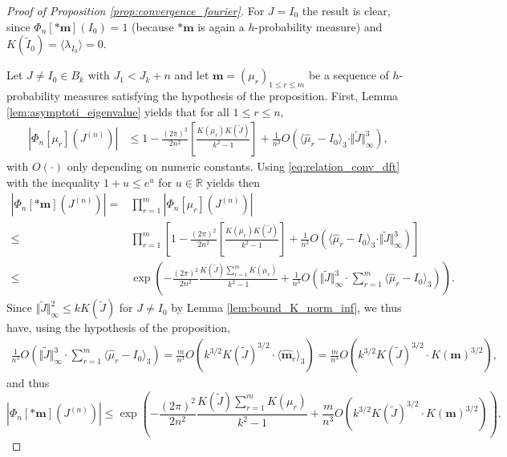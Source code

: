 \documentclass[10pt,11pt]{amsart}%
\begin{document}
\begin{proof}[Proof of Proposition \ref{prop:convergence_fourier}]
For $J=I_0$ the result is clear, since $\Phi_n[*\mathbf{m}](I_0)=1$ (because $*\mathbf{m}$ is again a $h$-probability measure) and $K(\tilde{I}_0)=\langle \lambda_{I_0}\rangle=0$. 

Let $J\not=I_0\in B_{k}$ with $J_1<J_k+n$ and let $\mathbf{m}=(\mu_r)_{1\leq r\leq m}$ be a sequence of $h$-probability measures satisfying the hypothesis of the proposition. 
First, Lemma \ref{lem:asymptoti_eigenvalue} yields that for all $1\leq r\leq n$,
\begin{align*}
\left\vert\Phi_{n}[\mu_r](J^{(n)})\right\vert&\leq 1-\frac{(2\pi)^2}{2n^2}\left[\frac{K(\mu_r)K(\tilde{J})}{k^2-1}\right]+\frac{1}{n^3}O\left(\langle\hat{\mu}_r-I_0\rangle_3\cdot\Vert \tilde{J}\Vert_\infty^3\right),
\end{align*}
with $O(\cdot)$ only depending on numeric constants. Using \eqref{eq:relation_conv_dft} with the inequality $1+u\leq e^u$ for $u\in\mathbb{R}$ yields then
\begin{align*}
\left\vert\Phi_{n}[*\mathbf{m}](J^{(n)})\right\vert=&\prod_{r=1}^m\left\vert \Phi_{n}[\mu_r](J^{(n)})\right\vert \\
\leq& \prod_{r=1}^m\left[1-\frac{(2\pi)^2}{2n^2}\left[\frac{K(\mu_r)K(\tilde{J})}{k^2-1}\right]+\frac{1}{n^3}O\left(\langle\hat{\mu}_r-I_0\rangle_3\cdot\Vert \tilde{J}\Vert_\infty^3\right)\right]\\
\leq&\exp\left(-\frac{(2\pi)^2}{2n^2}\frac{K(\tilde{J})\sum_{r=1}^mK(\mu_r)}{k^2-1}+\frac{1}{n^3}O\left(\Vert \tilde{J}\Vert_\infty^3\cdot\sum_{r=1}^m\langle\hat{\mu}_r-I_0\rangle_3\right)\right).
\end{align*}
Since $\Vert \tilde{J}\Vert^2_{\infty}\leq kK(\tilde{J})$ for $J\not=I_0$ by Lemma \ref{lem:bound_K_norm_inf}, we thus have, using the hypothesis of the proposition,
\begin{align*}
\frac{1}{n^3}O\left(\Vert \tilde{J}\Vert_\infty^3\cdot\sum_{r=1}^m\langle\hat{\mu}_r-I_0\rangle_3\right)=\frac{m}{n^3}O\left(k^{3/2}K(\tilde{J})^{3/2}\cdot\langle  \hat{\mathbf{m}}_r\rangle_3\right)=\frac{m}{n^3}O\left(k^{3/2}K(\tilde{J})^{3/2}\cdot K(\mathbf{m})^{3/2}\right),
\end{align*}
and thus
\begin{equation}\label{eq:proof_prop_first_ineq}
\left\vert\Phi_{n}[*\mathbf{m}](J^{(n)})\right\vert\leq\exp\left(-\frac{(2\pi)^2}{2n^2}\frac{K(\tilde{J})\sum_{r=1}^mK(\mu_r)}{k^2-1}+\frac{m}{n^3}O\left(k^{3/2}K(\tilde{J})^{3/2}\cdot K(\mathbf{m})^{3/2}\right)\right).

\end{equation}
\end{proof}
\end{document}
